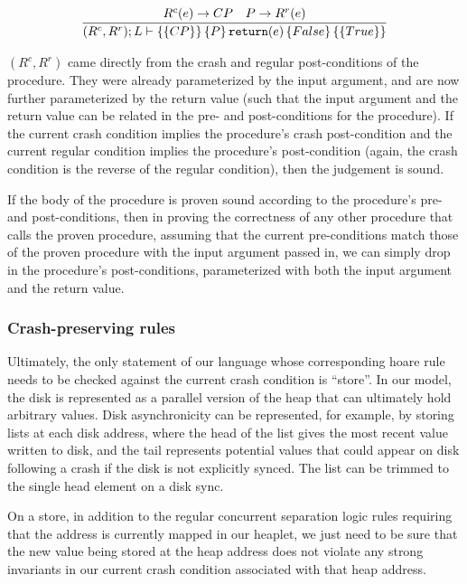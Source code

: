 \begin{gather*}
    \infer{\hoarestmt{(R^c,R^r)}{L}{CP}{P}{\texttt{return}(e)}{False}{True}}
	  {R^c(e) \imp CP & P \imp R^r(e)}
\end{gather*}

$(R^c,R^r)$ came directly from the crash and regular post-conditions of the
procedure. They were already parameterized by the input argument, and are now
further parameterized by the return value (such that the input argument and the
return value can be related in the pre- and post-conditions for the procedure).
If the current crash condition implies the procedure's crash post-condition and
the current regular condition implies the procedure's post-condition (again, the
crash condition is the reverse of the regular condition), then the judgement is
sound.

If the body of the procedure is proven sound according to the procedure's pre-
and post-conditions, then in proving the correctness of any other procedure that calls
the proven procedure, assuming that the current pre-conditions
match those of the proven procedure with the input argument passed in,
we can simply drop in the procedure's post-conditions, parameterized with both
the input argument and the return value.

\subsubsection{Crash-preserving rules}


Ultimately, the only statement of our language whose corresponding hoare rule
needs to be checked against the current crash condition is ``store''. In our
model, the disk is represented as a parallel version of the heap that can
ultimately hold arbitrary values. Disk asynchronicity can be represented, for
example, by storing lists at each disk address, where the head of the list gives
the most recent value written to disk, and the tail represents potential values
that could appear on disk following a crash if the disk is not explicitly synced.
The list can be trimmed to the single head element on a disk sync.

On a store, in addition to the regular concurrent separation logic rules
requiring that the address is currently mapped in our heaplet, we just need to
be sure that the new value being stored at the heap address does not violate any
strong invariants in our current crash condition associated with that heap
address.

